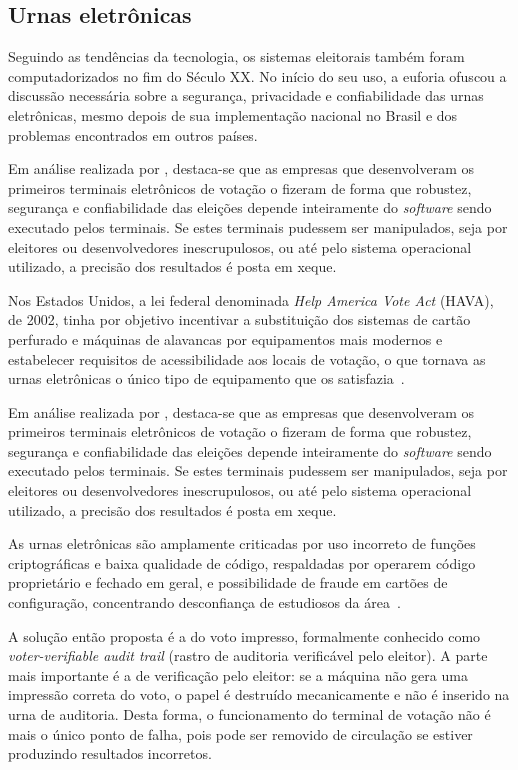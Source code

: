 \subsection{Urnas eletrônicas}

Seguindo as tendências da tecnologia, os sistemas eleitorais também foram
computadorizados no fim do Século XX. No início do seu uso, a euforia ofuscou a
discussão necessária sobre a segurança, privacidade e confiabilidade das urnas
eletrônicas, mesmo depois de sua implementação nacional no Brasil e dos
problemas encontrados em outros países.

Em análise realizada por \textcite{kohno2004analysis}, destaca-se que as
empresas que desenvolveram os primeiros terminais eletrônicos de votação o
fizeram de forma que robustez, segurança e confiabilidade das eleições depende
inteiramente do \textit{software} sendo executado pelos terminais. Se estes
terminais pudessem ser manipulados, seja por eleitores ou desenvolvedores
inescrupulosos, ou até pelo sistema operacional utilizado, a precisão dos
resultados é posta em xeque.

Nos Estados Unidos, a lei federal denominada \textit{Help America Vote Act}
(HAVA), de 2002, tinha por objetivo incentivar a substituição dos sistemas de
cartão perfurado e máquinas de alavancas por equipamentos mais modernos e
estabelecer requisitos de acessibilidade aos locais de votação, o que tornava
as urnas eletrônicas o único tipo de equipamento que os
satisfazia~\cite{davis1996direct}.

Em análise realizada por \textcite{kohno2004analysis}, destaca-se que as
empresas que desenvolveram os primeiros terminais eletrônicos de votação o
fizeram de forma que robustez, segurança e confiabilidade das eleições depende
inteiramente do \textit{software} sendo executado pelos terminais. Se estes
terminais pudessem ser manipulados, seja por eleitores ou desenvolvedores
inescrupulosos, ou até pelo sistema operacional utilizado, a precisão dos
resultados é posta em xeque.

As urnas eletrônicas são amplamente criticadas por uso incorreto de funções
criptográficas e baixa qualidade de código, respaldadas por operarem código
proprietário e fechado em geral, e possibilidade de fraude em cartões de
configuração, concentrando desconfiança de estudiosos da
área~\cite{feldman2006security}.

A solução então proposta é a do voto impresso, formalmente conhecido como
\textit{voter-verifiable audit trail} (rastro de auditoria verificável pelo
eleitor). A parte mais importante é a de verificação pelo eleitor: se a máquina
não gera uma impressão correta do voto, o papel é destruído mecanicamente e não
é inserido na urna de auditoria. Desta forma, o funcionamento do terminal de
votação não é mais o único ponto de falha, pois pode ser removido de circulação
se estiver produzindo resultados incorretos.

